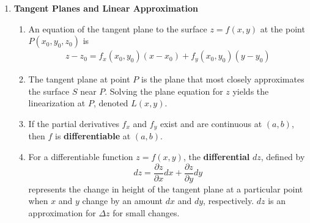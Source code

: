 \documentclass[10pt]{article}
\begin{document}
\begin{multicols*}{2}
\begin{enumerate}
    \item \textbf{Tangent Planes and Linear Approximation} 
    \begin{enumerate}
        \item An equation of the tangent plane to the surface $z=f(x,y)$ at the point $P(x_0, y_0, z_0)$ is
        \begin{align*}
            z - z_0 = f_x(x_0, y_0)(x-x_0) + f_y(x_0, y_0)(y-y_0)
        \end{align*}
        \item The tangent plane at point $P$ is the plane that most closely approximates the surface $S$ near $P$. Solving the plane equation for $z$ yields the linearization at $P$, denoted $L(x,y)$.
        \item If the partial derivatives $f_x$ and $f_y$ exist and are continuous at $(a,b)$, then $f$ is \textbf{differentiable} at $(a,b)$.
        
        \item For a differentiable function $z=f(x,y)$, the \textbf{differential} $dz$, defined by 
        $$
        dz = \frac{\partial z}{\partial x} dx + \frac{\partial z}{\partial y} dy
        $$
        represents the change in height of the tangent plane at a particular point when $x$ and $y$ change by an amount $dx$ and $dy$, respectively. $dz$ is an approximation for $\Delta z$ for small changes.
    \end{enumerate}
    

\end{enumerate}
\end{multicols*}
\end{document}
